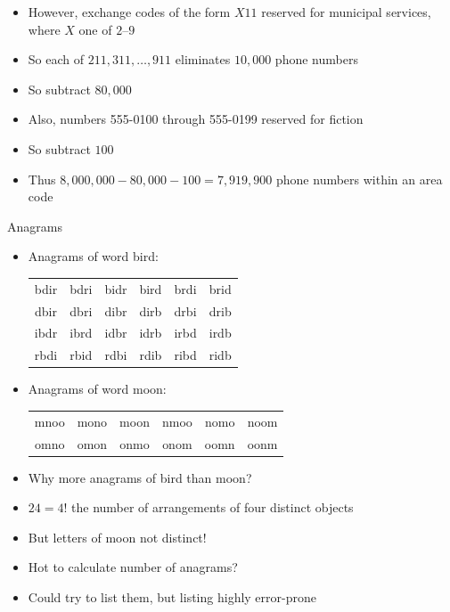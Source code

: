 \documentclass[handout]{beamer}
\theoremstyle{definition}
\begin{document}
\begin{frame}
\begin{itemize}
\item However, exchange codes of the form $X11$
reserved for municipal services, where $X$ one of $2$--$9$
\item So each of $211,311,\ldots,911$ eliminates $10,000$ phone numbers
\item So subtract $80,000$
\item Also, numbers 555-0100 through 555-0199 reserved for fiction
\item So subtract $100$
\item Thus $8,000,000-80,000-100=7,919,900$ phone numbers within an area code
\end{itemize}
\end{frame}

\begin{frame}{Anagrams}
\begin{itemize}
\item Anagrams of word \alert{bird}:
\begin{tabular}{cccccc}
bdir &bdri &bidr &bird &brdi &brid\\
dbir &dbri &dibr &dirb &drbi &drib\\
ibdr &ibrd &idbr &idrb &irbd &irdb\\
rbdi &rbid &rdbi &rdib &ribd &ridb 
\end{tabular}
\item Anagrams of word \alert{moon}:
\begin{tabular}{cccccc}
mnoo &mono &moon &nmoo &nomo &noom\\
omno &omon &onmo &onom &oomn &oonm 
\end{tabular}
\item Why more anagrams of \alert{bird} than \alert{moon}?
\item $24=4!$ the number of arrangements of four \alert{distinct} objects
\item But letters of \alert{moon} not distinct!
\item Hot to calculate number of anagrams?
\item Could try to list them, but listing highly error-prone
\end{itemize}
\end{frame}
\end{document}
